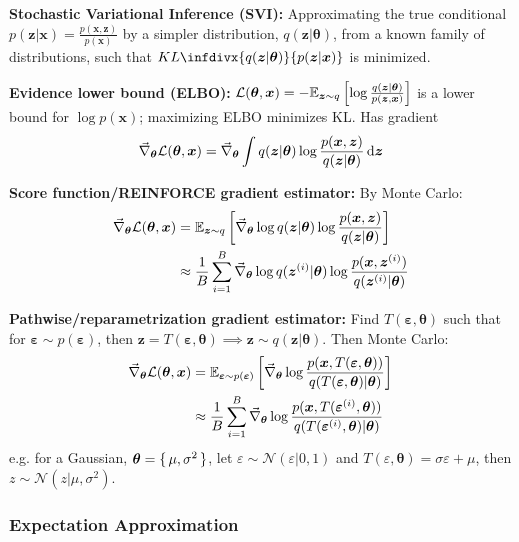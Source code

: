 \documentclass[twocolumn, 8pt]{extarticle}
\begin{document}
\textbf{Stochastic Variational Inference (SVI):} Approximating the true conditional \(p(\bm z | \bm x) = \frac{p(\bm x, \bm z)}{p(\bm x)}\)
by a simpler distribution, \(q(\bm z | \bm \theta)\), from a known family of distributions, such that
\(KL\infdivx{q(\bm z | \bm\theta)}{p(\bm z | \bm x)}\) is minimized.

\textbf{Evidence lower bound (ELBO):} \(\mathcal L(\bm\theta, \bm x) = -\mathbb E_{\bm z \sim q}\left[\log\frac{q(\bm z | \bm\theta)}{p(\bm z, \bm x)}\right]\)
is a lower bound for \(\log p(\bm x)\); maximizing ELBO minimizes KL.
Has gradient
\[
    \vec\nabla _{\bm\theta}\mathcal L(\bm\theta, \bm x) = \vec\nabla _{\bm\theta}\int q(\bm z | \bm\theta)\log\frac{p(\bm x, \bm z)}{q(\bm z | \bm \theta)}\,\mathrm{d}\bm z
\]

\textbf{Score function/REINFORCE gradient estimator:} By Monte Carlo:
\begin{align*}
    \vec\nabla _{\bm\theta}\mathcal L(\bm\theta, \bm x)
    &= \mathbb E_{\bm z \sim q}\left[\vec\nabla _{\bm\theta} \log q(\bm z | \bm\theta)\log\frac{p(\bm x, \bm z)}{q(\bm z | \bm\theta)}\right] \\
    &\approx \frac{1}{B}\sum _{i = 1}^B \vec\nabla _{\bm\theta}\log q(\bm z^{(i)} | \bm\theta)\log\frac{p(\bm x, \bm z^{(i)})}{q(\bm z^{(i)} | \bm\theta)}
\end{align*}

\textbf{Pathwise/reparametrization gradient estimator:} Find \(T(\bm\varepsilon, \bm\theta)\) such that for
\(\bm\varepsilon \sim p(\bm\varepsilon)\), then \(\bm z = T(\bm\varepsilon, \bm\theta) \implies \bm z \sim q(\bm z | \bm\theta)\).
Then Monte Carlo:
\begin{align*}
    \vec\nabla _{\bm\theta} \mathcal L(\bm\theta, \bm x)
    &= \mathbb E_{\bm\varepsilon \sim p(\bm\varepsilon)}\left[\vec\nabla _{\bm\theta}\log \frac{p(\bm x, T(\bm\varepsilon, \bm\theta))}{q(T(\bm\varepsilon, \bm\theta) | \bm\theta)}\right] \\
    &\approx \frac{1}{B}\sum _{i = 1}^B \vec\nabla _{\bm\theta}\log \frac{p(\bm x, T(\bm\varepsilon^{(i)}, \bm\theta))}{q(T(\bm\varepsilon^{(i)}, \bm\theta) | \bm\theta)}
\end{align*}
e.g. for a Gaussian, \(\bm\theta = \set{\mu, \sigma^2}\), let \(\varepsilon \sim \mathcal N(\varepsilon | 0, 1)\) and
\(T(\varepsilon, \bm\theta) = \sigma\varepsilon + \mu\), then \(z \sim \mathcal N(z | \mu, \sigma^2)\).

\subsubsection{Expectation Approximation}
\end{document}
